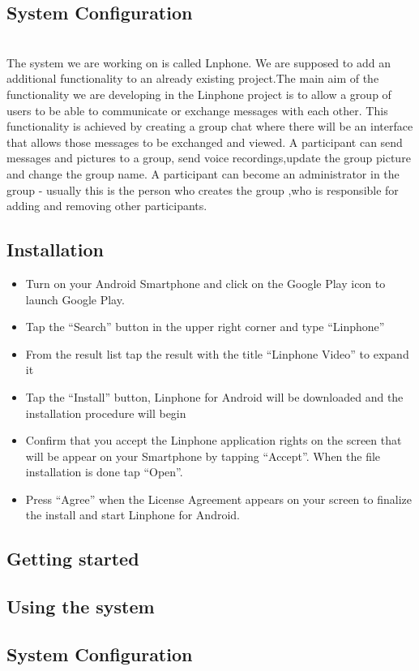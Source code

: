 \documentclass[a4paper]{article}
\begin{document}
\subsection{System Configuration}
\\
The system we are working on is called Lnphone. We are supposed to add an additional functionality  to an already existing project.The main aim of the functionality we are developing in the Linphone project is to allow a group of users to be able to communicate or exchange messages with each other. This functionality is achieved by creating a group chat where there will be an interface that allows those messages to be exchanged and viewed. A  participant can
send messages and pictures to a group, send voice recordings,update the group picture and change the  group name.
A participant can become an administrator in the group -  usually this is the person who creates the group ,who is 
responsible for adding and  removing other participants.
\\

\newpage
\subsection{Installation}
\begin{itemize}
\item Turn on your Android Smartphone and click on the Google Play icon to launch Google Play.
\item Tap the “Search” button in the upper right corner and type “Linphone”
\item From the result list tap the result with the title “Linphone Video” to expand it
\item Tap the “Install” button, Linphone for Android will be downloaded and the installation procedure will begin
\item Confirm that you accept the Linphone application rights on the screen that will be appear on your Smartphone by tapping “Accept”. When the file installation is done tap “Open”.
\item Press “Agree” when the License Agreement appears on your screen to finalize the install and start Linphone for Android.
\end{itemize}

\newpage
\subsection{Getting started}

\newpage
\subsection{Using the system}

\newpage
\subsection{System Configuration}
\newpage
\end{document}
